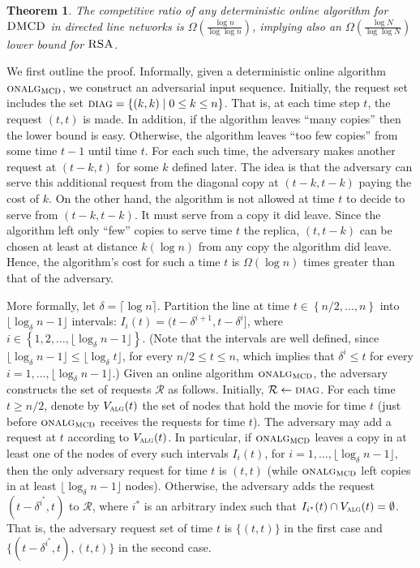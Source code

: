 \documentclass[11pt]{article}
\newtheorem{theorem}{Theorem}[section]
\def\proof{\par\noindent{\bf Proof:~}}
\newcommand{\DMCD}{\mbox{\sc DMCD}}
\newcommand{\RSA}{\mbox{\sc RSA}}
\newcommand{\calR}{\mathcal{R}}
\newcommand{\alg}{\textsc{alg}}
\newcommand{\set}[1]{\left\{ #1 \right\}}
\newcommand{\onalgrsa}[0]{\mbox{\sc onalg}_{\mbox{\sc\small mcd}}}
\newcommand{\diag}[0]{\mbox{\sc diag}}
\begin{document}
\begin{theorem}
The competitive ratio of any deterministic online algorithm for
$\DMCD$ in directed line networks is $\Omega(\frac{\log n}{\log\log n})$,
implying also an
$\Omega(\frac{\log N}{\log\log N})$ lower bound for $\RSA$.
\label{thm: lower bound for RSA and MCD on directed}
\end{theorem}
\proof
We first outline the proof.
Informally, given a deterministic online algorithm $\onalgrsa$, we construct an adversarial input sequence.
Initially, the request set includes the set $\diag=\{(k,k)\mid 0\leq k\leq n\}$.
That is, at each time step $t$, the request $(t,t)$ is made.
In addition, if the algorithm leaves ``many copies'' then the lower bound is easy.
Otherwise, the algorithm leaves ``too few copies'' from some time $t-1$ until time $t$.
For each such time, the adversary makes another request at $(t-k,t)$ for some $k$ defined later.
The idea is that the adversary can serve this additional request from the diagonal copy at $(t-k,t-k)$ paying the cost of $k$.
On the other hand,
the algorithm is not allowed at time $t$ to decide to serve from $(t-k,t-k)$.
It must serve from a copy it did leave.
Since the algorithm left only ``few'' copies to serve time $t$ the replica, $(t,t-k)$ can be chosen at least at distance $k(\log n)$ from any copy the algorithm did leave.
Hence, the algorithm's cost for such a time $t$ is $\Omega(\log n)$ times greater than that of the adversary.



More formally, let $\delta =\lceil\log n\rceil$.
Partition the line at time $t \in \set{n/2,\ldots,n}$ into
$\lfloor\log_\delta n -1\rfloor$ intervals:
$I_i(t) =
(t-\delta^{i+1},t-\delta^i]$, where $i \in \set{1,2, \ldots,
\lfloor\log_\delta n-1\rfloor}$.
(Note that the intervals are well defined, since $\lfloor\log_\delta n-1\rfloor\leq \lfloor\log_\delta t\rfloor$, for every $n/2\leq t\leq n$, which implies that $\delta^i\leq t$ for every $i=1,...,\lfloor\log_\delta n-1\rfloor$.)
Given an online algorithm $\onalgrsa$, the adversary constructs the set of
requests $\calR$ as follows.  Initially, $\calR \gets \diag$.
For each
time $t\geq n/2$, denote by $V_{\alg}(t)$ the set of
nodes that hold the movie for time $t$ (just before $\onalgrsa$ receives
the requests for time $t$).
The adversary may add a request at $t$ according to $V_{\alg}(t)$.
In particular,
if $\onalgrsa$ leaves a copy in at least one of the nodes of every such intervals $I_i(t)$, for $i=1,...,\lfloor\log_\delta n-1\rfloor$,
then the only adversary request for time $t$ is $(t,t)$ (while $\onalgrsa$ left copies in at least $\lfloor\log_\delta n -1\rfloor$ nodes).
Otherwise, the adversary adds the request $(t-\delta^{i^*},t)$ to $\calR$, where $i^*$ is an arbitrary index such that $I_{i^*}(t)\cap V_{\alg}(t) = \emptyset$.
That is, the adversary request set of time $t$ is $\{(t,t)\}$ in the first case and  $\{(t-\delta^{i^*},t),(t,t)\}$ in the second case.
\end{document}
